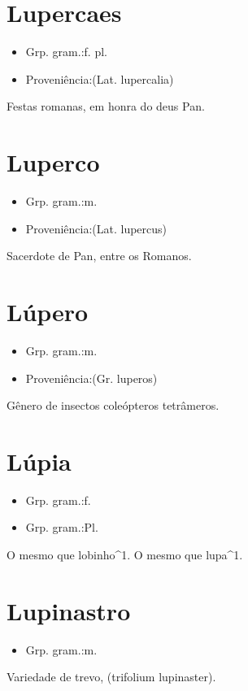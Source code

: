 \section{Lupercaes}
\begin{itemize}
\item {Grp. gram.:f. pl.}
\end{itemize}
\begin{itemize}
\item {Proveniência:(Lat. \textunderscore lupercalia\textunderscore )}
\end{itemize}
Festas romanas, em honra do deus Pan.
\section{Luperco}
\begin{itemize}
\item {Grp. gram.:m.}
\end{itemize}
\begin{itemize}
\item {Proveniência:(Lat. \textunderscore lupercus\textunderscore )}
\end{itemize}
Sacerdote de Pan, entre os Romanos.
\section{Lúpero}
\begin{itemize}
\item {Grp. gram.:m.}
\end{itemize}
\begin{itemize}
\item {Proveniência:(Gr. \textunderscore luperos\textunderscore )}
\end{itemize}
Gênero de insectos coleópteros tetrâmeros.
\section{Lúpia}
\begin{itemize}
\item {Grp. gram.:f.}
\end{itemize}
\begin{itemize}
\item {Grp. gram.:Pl.}
\end{itemize}
O mesmo que \textunderscore lobinho\textunderscore ^1.
O mesmo que \textunderscore lupa\textunderscore ^1.
\section{Lupinastro}
\begin{itemize}
\item {Grp. gram.:m.}
\end{itemize}
Variedade de trevo, (\textunderscore trifolium lupinaster\textunderscore ).
